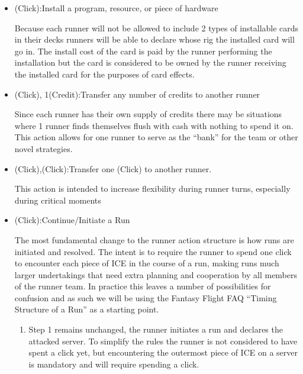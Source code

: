 \documentclass[titlepage]{article}
\begin{document}
			\begin{itemize}

				\item (Click):Install a program, resource, or piece of hardware

					Because each runner will not be allowed to include 2 types of installable cards in their decks runners will be able to declare whose rig the installed card will go in. The install cost of the card is paid by the runner performing the installation but the card is considered to be owned by the runner receiving the installed card for the purposes of card effects.

				\item (Click), 1(Credit):Transfer any number of credits to another runner

					Since each runner has their own supply of credits there may be situations where 1 runner finds themselves flush with cash with nothing to spend it on. This action allows for one runner to serve as the ``bank'' for the team or other novel strategies.

				\item (Click),(Click):Transfer one (Click) to another runner.

					This action is intended to increase flexibility during runner turns, especially during critical moments

				\item (Click):Continue/Initiate a Run

					The most fundamental change to the runner action structure is how runs are initiated and resolved. The intent is to require the runner to spend one click to encounter each piece of ICE in the course of a run, making runs much larger undertakings that need extra planning and cooperation by all members of the runner team. In practice this leaves a number of possibilities for confusion and as such we will be using the Fantasy Flight FAQ ``Timing Structure of a Run'' as a starting point.

					\begin{enumerate}

						\item Step 1 remains unchanged, the runner initiates a run and declares the attacked server. To simplify the rules the runner is not considered to have spent a click yet, but encountering the outermost piece of ICE on a server is mandatory and will require spending a click.


\end{enumerate}
\end{itemize}
\end{document}
